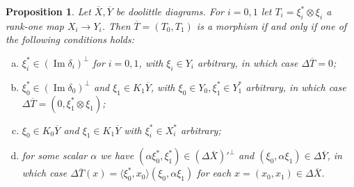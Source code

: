 \documentclass[a4paper,11pt]{article}
\theoremstyle{plain}
\newtheorem{proposition}{Proposition}[section]
\theoremstyle{remark}
\newcommand{\ip}[2]{{\langle {#1} , {#2} \rangle}}
\newcommand{\im}{{\operatorname{Im}}}
\begin{document}
\begin{proposition}\label{prop:rank_one_morphisms}
Let $\overline X,\overline Y$ be doolittle diagrams.  For $i=0,1$ let $T_i = \xi_i^*\otimes\xi_i$ a rank-one map $X_i\to Y_i$.  Then $\overline T=(T_0,T_1)$ is a morphism if and only if one of the following conditions holds:
\begin{enumerate}[(a)]
\item\label{prop:rank_one_morphisms:one}
$\xi_i^* \in (\im\delta_i)^\perp$ for $i=0,1$, with $\xi_i\in Y_i$ arbitrary, in which case $\Delta\overline T = 0$;
\item\label{prop:rank_one_morphisms:two}
$\xi_0^* \in (\im\delta_0)^\perp$ and $\xi_1\in K_1\overline Y$, with $\xi_0\in Y_0, \xi_1^*\in Y_1^*$ arbitrary, in which case $\Delta\overline T = (0, \xi_1^*\otimes\xi_1)$;
\item\label{prop:rank_one_morphisms:four}
$\xi_0\in K_0\overline Y$ and $\xi_1\in K_1\overline Y$ with $\xi_i^* \in X_i^*$ arbitrary;
\item\label{prop:rank_one_morphisms:five}
for some scalar $\alpha$ we have $(\alpha\xi_0^*, \xi_1^*) \in (\Delta\overline X)'^\perp$ and $(\xi_0,\alpha\xi_1) \in \Delta\overline Y$, in which case $\Delta\overline T(x) = \ip{\xi_0^*}{x_0} (\xi_0, \alpha\xi_1)$ for each $x=(x_0,x_1)\in\Delta\overline X$.
\end{enumerate}
\end{proposition}
\end{document}

